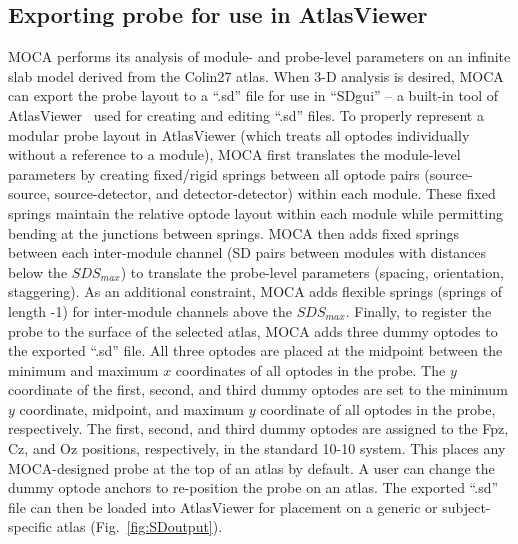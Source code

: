 \subsection{Exporting probe for use in AtlasViewer}
\ac{MOCA} performs its analysis of module- and probe-level parameters on an infinite slab model derived from the Colin27 atlas. When 3-D analysis is desired, \ac{MOCA} can export the probe layout to a ``.sd'' file for use in ``SDgui'' -- a built-in tool of AtlasViewer~\cite{Aasted2015} used for creating and editing ``.sd'' files. To properly represent a modular probe layout in AtlasViewer (which treats all optodes individually without a reference to a module), \ac{MOCA} first translates the module-level parameters by creating fixed/rigid springs between all optode pairs (source-source, source-detector, and detector-detector) within each module. These fixed springs maintain the relative optode layout within each module while permitting bending at the junctions between springs. \ac{MOCA} then adds fixed springs between each inter-module channel (\ac{SD} pairs between modules with distances below the $SDS_{max}$) to translate the probe-level parameters (spacing, orientation, staggering). As an additional constraint, \ac{MOCA} adds flexible springs (springs of length -1) for inter-module channels above the $SDS_{max}$. Finally, to register the probe to the surface of the selected atlas, \ac{MOCA} adds three dummy optodes to the exported ``.sd'' file. All three optodes are placed at the midpoint between the minimum and maximum $x$ coordinates of all optodes in the probe. The $y$ coordinate of the first, second, and third dummy optodes are set to the minimum $y$ coordinate, midpoint, and maximum $y$ coordinate of all optodes in the probe, respectively. The first, second, and third dummy optodes are assigned to the Fpz, Cz, and Oz positions, respectively, in the standard 10-10 system. This places any \ac{MOCA}-designed probe at the top of an atlas by default. A user can change the dummy optode anchors to re-position the probe on an atlas. The exported ``.sd'' file can then be loaded into AtlasViewer for placement on a generic or subject-specific atlas (Fig.~\ref{fig:SDoutput}).


